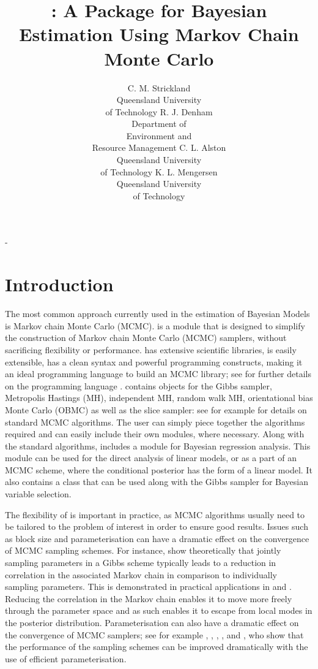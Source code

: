 -\documentclass[article]{jss}
\author{C. M. Strickland\\Queensland University\\ of Technology \And 
        R. J. Denham\\Department of \\Environment and\\ Resource Management \And
        C. L. Alston\\Queensland University\\ of Technology \And 
        K. L. Mengersen\\Queensland University\\ of Technology}
\title{\pkg{PyMCMC}: A \proglang{Python} Package for Bayesian Estimation 
  Using Markov Chain Monte Carlo}
\begin{document}
\section{Introduction}

The most common approach currently used in the estimation of Bayesian
Models is Markov chain Monte Carlo (MCMC).  is a
 module that is designed to simplify the construction
of Markov chain Monte Carlo (MCMC) samplers, without sacrificing
flexibility or performance.  has extensive scientific
libraries, is easily extensible, has a clean syntax and powerful
programming constructs, making it an ideal programming language to
build an MCMC library; see \citet{Python} for further details on the
programming language .  contains objects
for the Gibbs sampler, Metropolis Hastings (MH), independent MH,
random walk MH, orientational bias Monte Carlo (OBMC) as well as the
slice sampler: see for example \citet{RobertCassela1999} for details on
standard MCMC algorithms. The user can simply piece together the algorithms
required and can easily include their own modules, where necessary.
Along with the standard algorithms,  includes a module for
Bayesian regression analysis. This module can be used for the direct
analysis of linear models, or as a part of an MCMC scheme, where the
conditional posterior has the form of a linear model.  It also
contains a class that can be used along with the Gibbs sampler for
Bayesian variable selection.

The flexibility of  is important in practice, as MCMC
algorithms usually need to be tailored to the problem of interest in
order to ensure good results.  Issues such as block size and
parameterisation can have a dramatic effect on the convergence of MCMC
sampling schemes. For instance, \citet{LuiKongWong1994} show
theoretically that jointly sampling parameters in a Gibbs scheme
typically leads to a reduction in correlation in the associated Markov
chain in comparison to individually sampling parameters. This is
demonstrated in practical applications in \citet{CarterKohn1994} and
\citet{KimShephardChib1998}. Reducing the correlation in the Markov
chain enables it to move more freely through the parameter space and
as such enables it to escape from local modes in the posterior
distribution. Parameterisation can also have a dramatic effect on the
convergence of MCMC samplers; see for example
\citet{GelfandSahuCarlin1995}, \citet{RobersSahu1997},
\citet{PittShepard1999}, \citet{RobertMengersen1999},
\citet{FruwirthSchnatter2004} and \citet{StricklandMartinForbes2008},
who show that the performance of the sampling schemes can be improved
dramatically with the use of efficient parameterisation.
\end{document}
